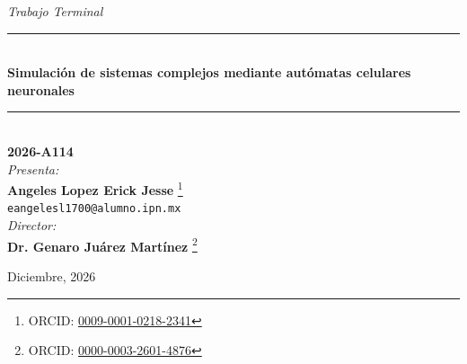 \begin{center}

	{\fontsize{14}{17}\selectfont \textit{Trabajo Terminal}}\\[0.2cm]

	\rule{0.6\textwidth}{0.4pt}\\[0.4cm]
	{\fontsize{16}{19}\selectfont \textbf{Simulación de sistemas complejos mediante autómatas celulares neuronales}}\\
	\rule{0.6\textwidth}{0.4pt}\\[0.2cm]
	{\fontsize{14}{17}\selectfont \textbf{2026-A114}}\\[2cm]

	{\fontsize{14}{17}\selectfont \textit{Presenta:}}\\[0.4cm]
	{\fontsize{14}{17}\selectfont \textbf{Angeles Lopez Erick Jesse}}%
	{\renewcommand{\thefootnote}{\fnsymbol{footnote}}%
	\footnote[1]{ORCID: \href{https://orcid.org/0009-0001-0218-2341}{0009-0001-0218-2341}}}\\[0.2cm]
	{\small \texttt{eangelesl1700@alumno.ipn.mx}}\\[2cm]

	{\fontsize{14}{17}\selectfont \textit{Director:}}\\[0.4cm]
	{\fontsize{14}{17}\selectfont \textbf{Dr. Genaro Juárez Martínez}}%
	{\renewcommand{\thefootnote}{\fnsymbol{footnote}}%
	\footnote[2]{ORCID: \href{https://orcid.org/0000-0003-2601-4876}{0000-0003-2601-4876}}}

	\vfill

	{\raggedleft \fontsize{14}{17}\selectfont Diciembre, 2026\par}

\end{center}
\restoregeometry
